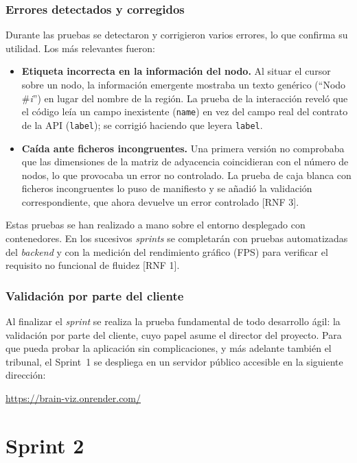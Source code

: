\subsubsection*{Errores detectados y corregidos}

Durante las pruebas se detectaron y corrigieron varios errores, lo que confirma su utilidad. Los más
relevantes fueron:

\begin{itemize}
	\item \textbf{Etiqueta incorrecta en la información del nodo.} Al situar el cursor sobre un nodo, la
		información emergente mostraba un texto genérico (``Nodo \#\textit{i}'') en lugar del nombre de
		la región. La prueba de la interacción reveló que el código leía un campo inexistente
		(\texttt{name}) en vez del campo real del contrato de la API (\texttt{label}); se corrigió
		haciendo que leyera \texttt{label}.
	\item \textbf{Caída ante ficheros incongruentes.} Una primera versión no comprobaba que las
		dimensiones de la matriz de adyacencia coincidieran con el número de nodos, lo que provocaba un
		error no controlado. La prueba de caja blanca con ficheros incongruentes lo puso de manifiesto
		y se añadió la validación correspondiente, que ahora devuelve un error controlado [RNF 3].
\end{itemize}

Estas pruebas se han realizado a mano sobre el entorno desplegado con contenedores. En los
sucesivos \textit{sprints} se completarán con pruebas automatizadas del \textit{backend} y con la
medición del rendimiento gráfico (FPS) para verificar el requisito no funcional de fluidez [RNF 1].

\subsubsection*{Validación por parte del cliente}

Al finalizar el \textit{sprint} se realiza la prueba fundamental de todo desarrollo ágil: la
validación por parte del cliente, cuyo papel asume el director del proyecto. Para que pueda probar la
aplicación sin complicaciones, y más adelante también el tribunal, el Sprint~1 se despliega en un
servidor público accesible en la siguiente dirección:

\begin{center}
	\url{https://brain-viz.onrender.com/}
\end{center}

\section{Sprint 2}

